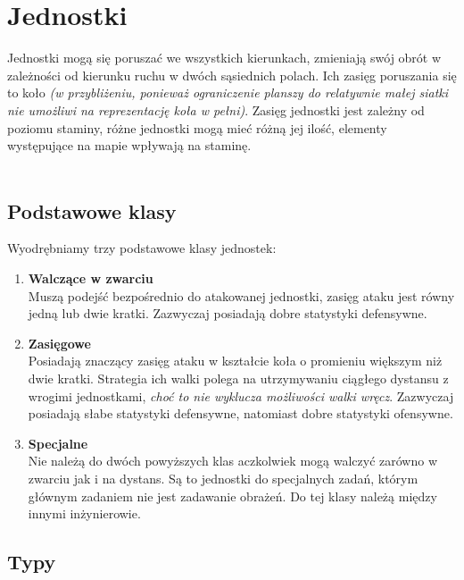 \documentclass[oneside]{lmdEN}%
\begin{document}
\section{Jednostki}

Jednostki mogą się poruszać we wszystkich kierunkach, zmieniają swój obrót w zależności od kierunku ruchu w dwóch sąsiednich polach. Ich zasięg poruszania się to koło \textit{(w przybliżeniu, ponieważ ograniczenie planszy do relatywnie małej siatki nie umożliwi na reprezentację koła w pełni)}. Zasięg jednostki jest zależny od poziomu staminy, różne jednostki mogą mieć różną jej ilość, elementy występujące na mapie wpływają na staminę.\\\\\noindent

\subsection{Podstawowe klasy}
Wyodrębniamy trzy podstawowe klasy jednostek:
\begin{enumerate}
    \item \textbf{Walczące w zwarciu}\\
          Muszą podejść bezpośrednio do atakowanej jednostki, zasięg ataku jest równy jedną lub dwie kratki. Zazwyczaj posiadają dobre statystyki defensywne.
    \item \textbf{Zasięgowe}\\
          Posiadają znaczący zasięg ataku w kształcie koła o promieniu większym niż dwie kratki. Strategia ich walki polega na utrzymywaniu ciągłego dystansu z wrogimi jednostkami, \textit{choć to nie wyklucza możliwości walki wręcz}. Zazwyczaj posiadają słabe statystyki defensywne, natomiast dobre statystyki ofensywne.
    \item \textbf{Specjalne}\\
          Nie należą do dwóch powyższych klas aczkolwiek mogą walczyć zarówno w zwarciu jak i na dystans. Są to jednostki do specjalnych zadań, którym głównym zadaniem nie jest zadawanie obrażeń. Do tej klasy należą między innymi inżynierowie.
\end{enumerate}

\subsection{Typy}
\end{document}
